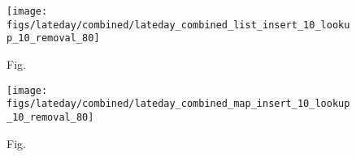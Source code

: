 \documentclass[11pt]{article}
\begin{document}
\begin{figure}[h]
\centering
\texttt{[image: figs/lateday/combined/lateday\_combined\_list\_insert\_10\_lookup\_10\_removal\_80]}
\caption{Fig.}
\label{fig:fig1}
\end{figure}

\begin{figure}[h]
\centering
\texttt{[image: figs/lateday/combined/lateday\_combined\_map\_insert\_10\_lookup\_10\_removal\_80]}
\caption{Fig.}
\label{fig:fig2}
\end{figure}

\printbibliography
\end{document}
